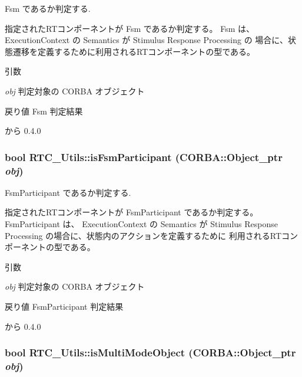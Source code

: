 Fsm であるか判定する. 

指定されたRTコンポーネントが Fsm であるか判定する。 Fsm は、 ExecutionContext の Semantics が Stimulus Response Processing の 場合に、状態遷移を定義するために利用されるRTコンポーネントの型である。


\begin{DoxyParams}{引数}
\item[{\em obj}]判定対象の CORBA オブジェクト\end{DoxyParams}
\begin{DoxyReturn}{戻り値}
Fsm 判定結果
\end{DoxyReturn}
\begin{DoxySince}{から}
0.4.0 
\end{DoxySince}
\subsubsection[{isFsmParticipant}]{\setlength{\rightskip}{0pt plus 5cm}bool RTC\_\-Utils::isFsmParticipant (CORBA::Object\_\-ptr {\em obj})}\label{namespaceRTC__Utils_a52ff8d6e964922f9673ca78830650e3e}


FsmParticipant であるか判定する. 

指定されたRTコンポーネントが FsmParticipant であるか判定する。 FsmParticipant は、 ExecutionContext の Semantics が Stimulus Response Processing の場合に、状態内のアクションを定義するために 利用されるRTコンポーネントの型である。


\begin{DoxyParams}{引数}
\item[{\em obj}]判定対象の CORBA オブジェクト\end{DoxyParams}
\begin{DoxyReturn}{戻り値}
FsmParticipant 判定結果
\end{DoxyReturn}
\begin{DoxySince}{から}
0.4.0 
\end{DoxySince}
\subsubsection[{isMultiModeObject}]{\setlength{\rightskip}{0pt plus 5cm}bool RTC\_\-Utils::isMultiModeObject (CORBA::Object\_\-ptr {\em obj})}\label{namespaceRTC__Utils_ae4b1334407be2113a145ee2cf06e3775}


